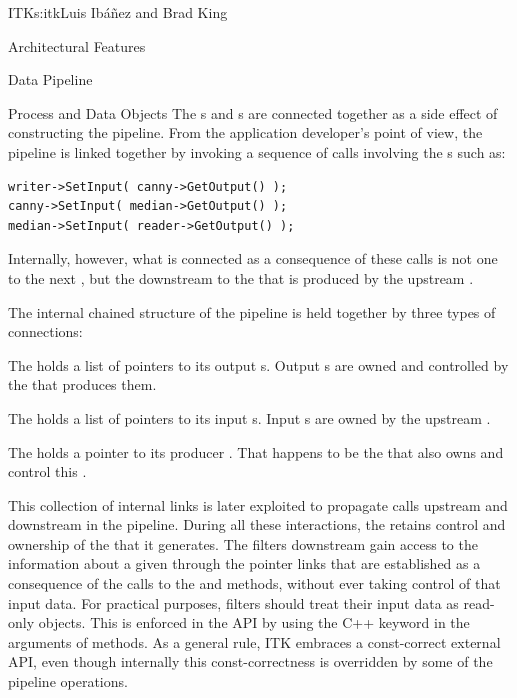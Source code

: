 \begin{aosachapter}{ITK}{s:itk}{Luis Ib\'{a}\~{n}ez and Brad King}
\begin{aosasect1}{Architectural Features}
\begin{aosasect2}{Data Pipeline}
\begin{aosasect3}{Process and Data Objects}
The s and s are connected together as a
side effect of constructing the pipeline. From the
application developer's point of view, the pipeline is linked together by
invoking a sequence of calls involving the s such as:

\begin{verbatim}
writer->SetInput( canny->GetOutput() );
canny->SetInput( median->GetOutput() );
median->SetInput( reader->GetOutput() );
\end{verbatim}

Internally, however, what is connected as a consequence of these calls is
not one  to the next , but the
downstream  to the  that is produced by
the upstream .

The internal chained structure of the pipeline is held together by three types
of connections:

\begin{aosaitemize}
\item The  holds a list of pointers to its output
s. Output s are owned and controlled by the
 that produces them.
\item The  holds a list of pointers to its input
s. Input s are owned by the upstream
.
\item The  holds a pointer to its producer
. That happens to be the  that also
owns and control this .
\end{aosaitemize}


This collection of internal links is later exploited to propagate calls
upstream and downstream in the pipeline. During all these interactions, the
 retains control and ownership of the 
that it generates.  The filters downstream gain access to the information about a
given  through the pointer links that are established as a
consequence of the calls to the  and  methods,
without ever taking control of that input data. For practical purposes, filters
should treat their input data as read-only objects. This is enforced in the API
by using the C++  keyword in the arguments of 
methods. As a general rule, ITK embraces a const-correct external API, even
though internally this const-correctness is overridden by some of the pipeline
operations.


\end{aosasect3}
\end{aosasect2}
\end{aosasect1}
\end{aosachapter}
